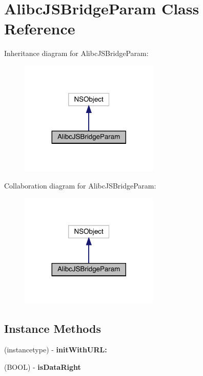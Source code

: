 \hypertarget{interface_alibc_j_s_bridge_param}{}\section{Alibc\+J\+S\+Bridge\+Param Class Reference}
\label{interface_alibc_j_s_bridge_param}


Inheritance diagram for Alibc\+J\+S\+Bridge\+Param\+:\nopagebreak
\begin{figure}[H]
\begin{center}
\leavevmode
\includegraphics[width=188pt]{interface_alibc_j_s_bridge_param__inherit__graph}
\end{center}
\end{figure}


Collaboration diagram for Alibc\+J\+S\+Bridge\+Param\+:\nopagebreak
\begin{figure}[H]
\begin{center}
\leavevmode
\includegraphics[width=188pt]{interface_alibc_j_s_bridge_param__coll__graph}
\end{center}
\end{figure}
\subsection*{Instance Methods}
\begin{DoxyCompactItemize}
\item 
\mbox{\label{interface_alibc_j_s_bridge_param_ae890f5d5c9ab25ae0447782d1ef446c5}} 
(instancetype) -\/ {\bfseries init\+With\+U\+R\+L\+:}
\item 
\mbox{\label{interface_alibc_j_s_bridge_param_aa55dc3284d7ce2a59db654af02154977}} 
(B\+O\+OL) -\/ {\bfseries is\+Data\+Right}
\end{DoxyCompactItemize}
